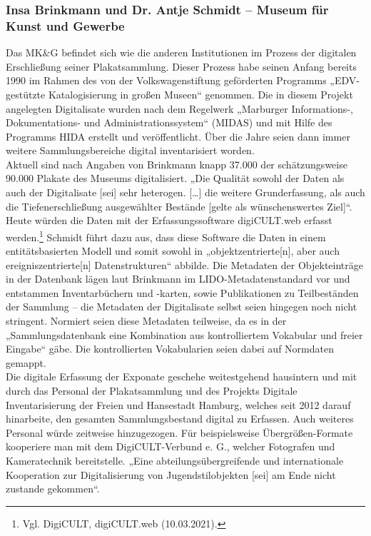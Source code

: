 \documentclass[a4paper,12pt,ngerman]{article}
\begin{document}
\subsubsection{Insa Brinkmann und Dr. Antje Schmidt – Museum für Kunst und Gewerbe}
Das MK\&G befindet sich wie die anderen Institutionen im Prozess der digitalen Erschließung seiner Plakatsammlung. Dieser Prozess habe seinen Anfang bereits 1990 im Rahmen des von der Volkswagenstiftung geförderten Programms „EDV-gestützte Katalogisierung in großen Museen“ genommen. Die in diesem Projekt angelegten Digitalisate wurden nach dem Regelwerk „Marburger Informations-, Dokumentations- und Administrationssystem“ (MIDAS) und mit Hilfe des Programms HIDA erstellt und veröffentlicht. Über die Jahre seien dann immer weitere Sammlungsbereiche digital inventarisiert worden. \\
Aktuell sind nach Angaben von Brinkmann knapp 37.000 der schätzungsweise 90.000 Plakate des Museums digitalisiert. „Die Qualität sowohl der Daten als auch der Digitalisate [sei] sehr heterogen. […] die weitere Grunderfassung, als auch die Tiefenerschließung ausgewählter Bestände [gelte als wünschenswertes Ziel]“. \\
Heute würden die Daten mit der Erfassungssoftware digiCULT.web erfasst werden.\footnote{Vgl. DigiCULT, digiCULT.web (10.03.2021).}  Schmidt führt dazu aus, dass diese Software die Daten in einem entitätsbasierten Modell und somit sowohl in „objektzentrierte[n], aber auch ereigniszentrierte[n] Datenstrukturen“ abbilde. Die Metadaten der Objekteinträge in der Datenbank lägen laut Brinkmann im LIDO-Metadatenstandard vor und entstammen Inventarbüchern und -karten, sowie Publikationen zu Teilbeständen der Sammlung – die Metadaten der Digitalisate selbst seien hingegen noch nicht stringent. Normiert seien diese Metadaten teilweise, da es in der „Sammlungsdatenbank eine Kombination aus kontrolliertem Vokabular und freier Eingabe“ gäbe. Die kontrollierten Vokabularien seien dabei auf Normdaten gemappt. \\
Die digitale Erfassung der Exponate geschehe weitestgehend hausintern und mit durch das Personal der Plakatsammlung und des Projekts Digitale Inventarisierung der Freien und Hansestadt Hamburg, welches seit 2012 darauf hinarbeite, den gesamten Sammlungsbestand digital zu Erfassen. Auch weiteres Personal würde zeitweise hinzugezogen. Für beispielsweise Übergrößen-Formate kooperiere man mit dem DigiCULT-Verbund e. G., welcher Fotografen und Kameratechnik bereitstelle. „Eine abteilungsübergreifende und internationale Kooperation zur Digitalisierung von Jugendstilobjekten [sei] am Ende nicht zustande gekommen“. \\
\end{document}
